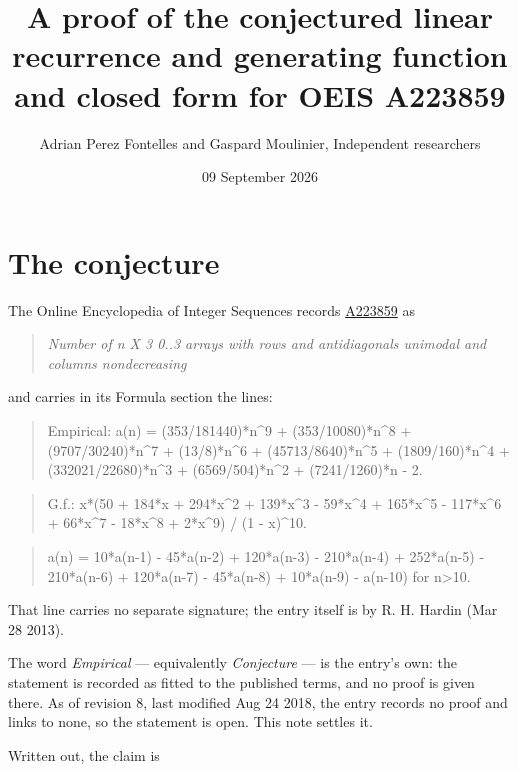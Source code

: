 \documentclass[11pt]{article}
\title{A proof of the conjectured linear recurrence and generating function and closed form for OEIS A223859}
\author{Adrian Perez Fontelles and Gaspard Moulinier, Independent researchers}
\date{09 September 2026}
\theoremstyle{definition}
\begin{document}
\maketitle
\section{The conjecture}

The Online Encyclopedia of Integer Sequences records \href{https://oeis.org/A223859}{A223859} as

\begin{quote}\itshape Number of n X 3 0..3 arrays with rows and antidiagonals unimodal and columns nondecreasing\end{quote}

and carries in its Formula section the lines:

\begin{quote}\ttfamily Empirical: a(n) = (353/181440)*n\textasciicircum{}9 + (353/10080)*n\textasciicircum{}8 + (9707/30240)*n\textasciicircum{}7 + (13/8)*n\textasciicircum{}6 + (45713/8640)*n\textasciicircum{}5 + (1809/160)*n\textasciicircum{}4 + (332021/22680)*n\textasciicircum{}3 + (6569/504)*n\textasciicircum{}2 + (7241/1260)*n - 2.\end{quote}

\begin{quote}\ttfamily G.f.: x*(50 + 184*x + 294*x\textasciicircum{}2 + 139*x\textasciicircum{}3 - 59*x\textasciicircum{}4 + 165*x\textasciicircum{}5 - 117*x\textasciicircum{}6 + 66*x\textasciicircum{}7 - 18*x\textasciicircum{}8 + 2*x\textasciicircum{}9) / (1 - x)\textasciicircum{}10.\end{quote}

\begin{quote}\ttfamily a(n) = 10*a(n-1) - 45*a(n-2) + 120*a(n-3) - 210*a(n-4) + 252*a(n-5) - 210*a(n-6) + 120*a(n-7) - 45*a(n-8) + 10*a(n-9) - a(n-10) for n>10.\end{quote}

That line carries no separate signature; the entry itself is by R. H. Hardin (Mar 28 2013).

The word {\itshape Empirical} --- equivalently {\itshape Conjecture} --- is the entry's own: the statement is recorded as fitted to the published terms, and no proof is given there. As of revision 8, last modified Aug 24 2018, the entry records no proof and links to none, so the statement is open. This note settles it.

Written out, the claim is
\end{document}
